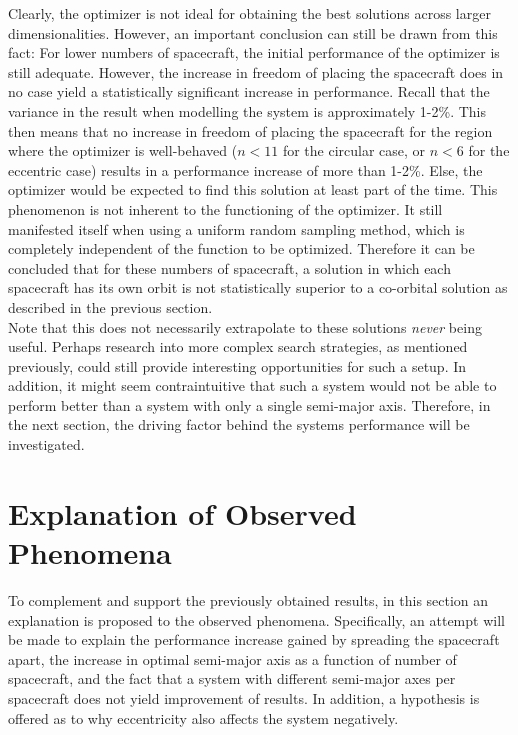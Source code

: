 Clearly, the optimizer is not ideal for obtaining the best solutions across larger dimensionalities. However, an important conclusion can still be drawn from this fact: For lower numbers of spacecraft, the initial performance of the optimizer is still adequate. However, the increase in freedom of placing the spacecraft does in no case yield a statistically significant increase in performance. Recall that the variance in the result when modelling the system is approximately 1-2\%. This then means that no increase in freedom of placing the spacecraft for the region where the optimizer is well-behaved ($n < 11$ for the circular case, or $n < 6$ for the eccentric case) results in a performance increase of more than 1-2\%. Else, the optimizer would be expected to find this solution at least part of the time. This phenomenon is not inherent to the functioning of the optimizer. It still manifested itself when using a uniform random sampling method, which is completely independent of the function to be optimized. Therefore it can be concluded that for these numbers of spacecraft, a solution in which each spacecraft has its own orbit is not statistically superior to a co-orbital solution as described in the previous section. \\

Note that this does not necessarily extrapolate to these solutions \textit{never} being useful. Perhaps research into more complex search strategies, as mentioned previously, could still provide interesting opportunities for such a setup. In addition, it might seem contraintuitive that such a system would not be able to perform better than a system with only a single semi-major axis. Therefore, in the next section, the driving factor behind the systems performance will be investigated.\\

\section{Explanation of Observed Phenomena}
\label{sec:results_explanation}
To complement and support the previously obtained results, in this section an explanation is proposed to the observed phenomena. Specifically, an attempt will be made to explain the performance increase gained by spreading the spacecraft apart, the increase in optimal semi-major axis as a function of number of spacecraft, and the fact that a system with different semi-major axes per spacecraft does not yield improvement of results. In addition, a hypothesis is offered as to why eccentricity also affects the system negatively. \\


